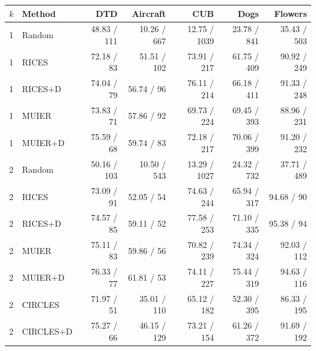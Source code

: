 \begin{tabular}{llrrrrr}
\toprule
$k$ & Method & DTD & Aircraft & CUB & Dogs & Flowers \\
\midrule
1 & Random & 48.83 / 111 & 10.26 / 667 & 12.75 / 1039 & 23.78 / 841 & 35.43 / 503 \\
1 & RICES & 72.18 / 83 & 51.51 / 102 & 73.91 / 217 & 61.75 / 409 & 90.92 / 249 \\
1 & RICES+D & 74.04 / 79 & 56.74 / 96 & 76.11 / 214 & 66.18 / 411 & 91.33 / 248 \\
1 & MUIER & 73.83 / 71 & 57.86 / 92 & 69.73 / 224 & 69.45 / 393 & 88.96 / 231 \\
1 & MUIER+D & 75.59 / 68 & 59.74 / 83 & 72.18 / 217 & 70.06 / 399 & 91.20 / 232 \\
2 & Random & 50.16 / 103 & 10.50 / 543 & 13.29 / 1027 & 24.32 / 732 & 37.71 / 489 \\
2 & RICES & 73.09 / 91 & 52.05 / 54 & 74.63 / 244 & 65.94 / 317 & 94.68 / 90 \\
2 & RICES+D & 74.57 / 85 & 59.11 / 52 & 77.58 / 253 & 71.10 / 335 & 95.38 / 94 \\
2 & MUIER & 75.11 / 83 & 59.86 / 56 & 70.82 / 239 & 74.34 / 324 & 92.03 / 112 \\
2 & MUIER+D & 76.33 / 77 & 61.81 / 53 & 74.11 / 227 & 75.44 / 319 & 94.63 / 116 \\
2 & CIRCLES & 71.97 / 51 & 35.01 / 110 & 65.12 / 182 & 52.30 / 395 & 86.33 / 195 \\
2 & CIRCLES+D & 75.27 / 66 & 46.15 / 129 & 73.21 / 154 & 61.26 / 372 & 91.69 / 192 \\
\bottomrule
\end{tabular}
